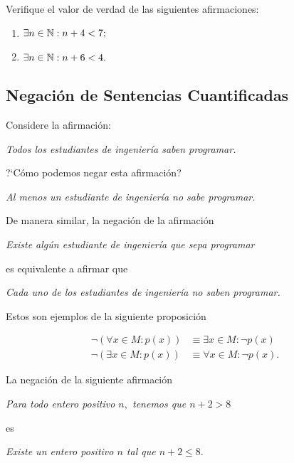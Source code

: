  Verifique el valor de verdad de las siguientes afirmaciones:
 \begin{enumerate}
  \item $\exists n  \in \mathbb{N}: n+4<7;$ 
  \item $\exists n \in \mathbb{N}: n+6<4.$
 \end{enumerate}



\subsection{Negación de Sentencias Cuantificadas}



 Considere la afirmación:
 \begin{center}
  \emph{Todos los estudiantes de ingeniería saben programar.}
 \end{center}
?`Cómo podemos negar esta afirmación?


\begin{center}
 \emph{Al menos un estudiante de ingeniería no sabe programar.}
\end{center} 


 De manera similar, la negación de la afirmación
 \begin{center}
  \emph{Existe algún estudiante de ingeniería que sepa programar}
 \end{center}
 es equivalente a afirmar que 
 \begin{center}
  \emph{Cada uno de los estudiantes de ingeniería no saben programar.}
 \end{center}

Estos son ejemplos de la siguiente proposición

 \begin{teorema}[DeMorgan]
  \begin{align}
  \label{lip:thm:4.4}
   \neg\left( \forall x\in M: p(x) \right)& \equiv \exists x\in M: \neg p(x)\\
   \label{lip:thm:4.5}
   \neg\left( \exists x\in M: p(x) \right)& \equiv \forall x\in M: \neg p(x).
  \end{align}

 \end{teorema}




 \begin{problema}
  \label{lip:exmp:4.10.a}
  La negación de la siguiente afirmación
  \begin{center}
   \emph{Para todo entero positivo $n,$ tenemos que $n+2>8$}
  \end{center}
es 
\begin{center}
 \emph{Existe un entero positivo $n$ tal que $n+2 \leq 8.$}
\end{center}

 \end{problema}




